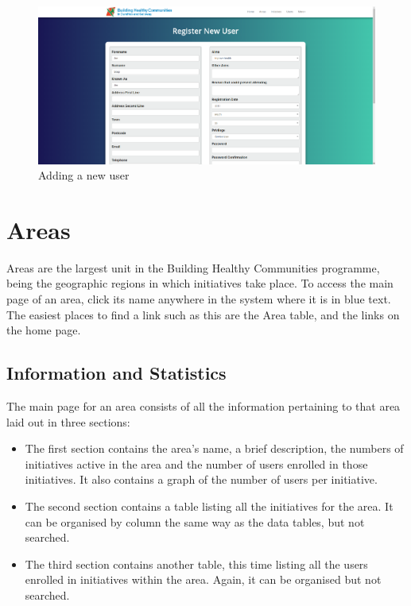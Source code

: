 \documentclass{bhcguides}
\begin{document}
\begin{figure}[h!]
 \centerline{\includegraphics[width=\textwidth, height=\textheight, keepaspectratio]{newuser.png}}
 \caption{Adding a new user}
 \label{fig:newUser}
\end{figure}

\pagebreak

\section{Areas}
\label{sec:areas}

Areas are the largest unit in the Building Healthy Communities programme, being the geographic regions in which initiatives take place. To access the main page of an area, click its name anywhere in the system where it is in blue text. The easiest places to find a link such as this are the Area table, and the links on the home page.

\subsection{Information and Statistics}
\label{ssec:areainfoandstats}

The main page for an area consists of all the information pertaining to that area laid out in three sections:

\begin{itemize}
	\item The first section contains the area's name, a brief description, the numbers of initiatives active in the area and the number of users enrolled in those initiatives. It also contains a graph of the number of users per initiative.
	\item The second section contains a table listing all the initiatives for the area. It can be organised by column the same way as the data tables, but not searched.
	\item The third section contains another table, this time listing all the users enrolled in initiatives within the area. Again, it can be organised but not searched.
\end{itemize}
\end{document}
